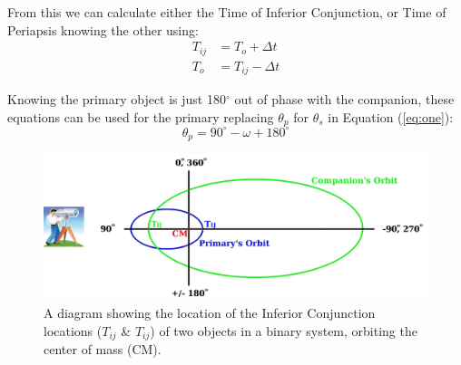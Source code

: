 \documentclass[12pt,preprint]{aastex}
\begin{document}

From this we can calculate either the Time of Inferior Conjunction, or Time of Periapsis knowing the other using:
\begin{subequations}
\begin{align}
T_{ij} &= T_{o}+\Delta t\\
T_o &= T_{ij}-\Delta t
\end{align}
\end{subequations}



Knowing the primary object is just 180$^{\circ}$ out of phase with the companion, these equations can be used for the primary replacing $\theta_p$ for $\theta_s$ in Equation (\ref{eq:one}):
\begin{equation}
\theta_p = 90^{\circ}-\omega+180^{\circ}
\end{equation}


\begin{figure}[htp]
\begin{center}
\includegraphics[scale=0.31]{Figures/TcToEllipses2-withTelescope4.jpeg}
\caption[Binary Inferior Conjunction Diagram]{A diagram showing the location of the Inferior Conjunction locations ({\color{green}$T_{ij}$} \& {\color{blue}$T_{ij}$}) of two objects in a binary system, orbiting the center of mass ({\color{red}CM}).}
\label{fig:ToTcDiagram}
\end{center}
\end{figure}
\end{document}
